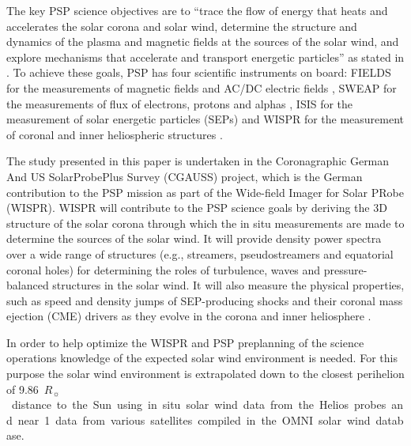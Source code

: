 \documentclass[]{aa}
\newcommand{\Rs}{$R_\sun{}$}
\begin{document}
	The key PSP science objectives are to “trace the flow of energy that heats and accelerates the solar corona and solar wind, determine the structure and dynamics of the plasma and magnetic fields at the sources of the solar wind, and explore mechanisms that accelerate and transport energetic particles” as stated in \citet{Fox2015}. To achieve these goals, PSP has four scientific instruments on board: FIELDS for the measurements of magnetic fields and AC/DC electric fields \citep{Bale2016}, SWEAP for the measurements of flux of electrons, protons and alphas \citep{Kasper2016}, IS\sun{}IS for the measurement of solar energetic particles (SEPs) \citep{McComas2016} and WISPR for the measurement of coronal and inner heliospheric structures \citep{Vourlidas2016}.

	The study presented in this paper is undertaken in the Coronagraphic German And US SolarProbePlus Survey (CGAUSS) project, which is the German contribution to the PSP mission as part of the Wide-field Imager for Solar PRobe (WISPR). WISPR will contribute to the PSP science goals by deriving the 3D structure of the solar corona through which the in situ measurements are made to determine the sources of the solar wind. It will provide density power spectra over a wide range of structures (e.g., streamers, pseudostreamers and equatorial coronal holes) for determining the roles of turbulence, waves and pressure-balanced structures in the solar wind. It will also measure the physical properties, such as speed and density jumps of SEP-producing shocks and their coronal mass ejection (CME) drivers as they evolve in the corona and inner heliosphere \citep{Vourlidas2016}.

	In order to help optimize the WISPR and PSP preplanning of the science operations knowledge of the expected solar wind environment is needed. For this purpose the solar wind environment is extrapolated down to the closest perihelion of \SI{9.86}{\Rs} distance to the Sun using in situ solar wind data from the Helios probes and near \SI{1}{\au} data from various satellites compiled in the OMNI solar wind database.
\end{document}
